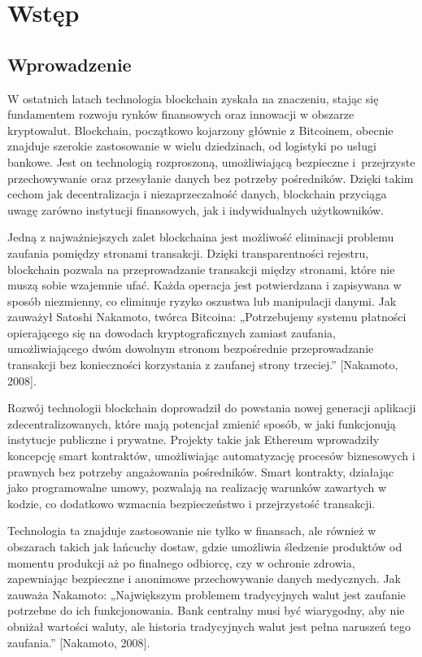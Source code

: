 \chapter{Wstęp}

\section{Wprowadzenie}

W ostatnich latach technologia blockchain zyskała na znaczeniu, stając się fundamentem rozwoju rynków finansowych oraz innowacji w obszarze kryptowalut. Blockchain, początkowo kojarzony głównie z Bitcoinem, obecnie znajduje szerokie zastosowanie w wielu dziedzinach, od logistyki po usługi bankowe. Jest on technologią rozproszoną, umożliwiającą bezpieczne i~przejrzyste przechowywanie oraz przesyłanie danych bez potrzeby pośredników. Dzięki takim cechom jak decentralizacja i niezaprzeczalność danych, blockchain przyciąga uwagę zarówno instytucji finansowych, jak i indywidualnych użytkowników.

Jedną z najważniejszych zalet blockchaina jest możliwość eliminacji problemu zaufania pomiędzy stronami transakcji. Dzięki transparentności rejestru, blockchain pozwala na przeprowadzanie transakcji między stronami, które nie muszą sobie wzajemnie ufać. Każda operacja jest potwierdzana i zapisywana w sposób niezmienny, co eliminuje ryzyko oszustwa lub manipulacji danymi. Jak zauważył Satoshi Nakamoto, twórca Bitcoina: „Potrzebujemy systemu płatności opierającego się na dowodach kryptograficznych zamiast zaufania, umożliwiającego dwóm dowolnym stronom bezpośrednie przeprowadzanie transakcji bez konieczności korzystania z zaufanej strony trzeciej.” [Nakamoto, 2008].

Rozwój technologii blockchain doprowadził do powstania nowej generacji aplikacji zdecentralizowanych, które mają potencjał zmienić sposób, w jaki funkcjonują instytucje publiczne i prywatne. Projekty takie jak Ethereum wprowadziły koncepcję smart kontraktów, umożliwiając automatyzację procesów biznesowych i prawnych bez potrzeby angażowania pośredników. Smart kontrakty, działając jako programowalne umowy, pozwalają na realizację warunków zawartych w kodzie, co dodatkowo wzmacnia bezpieczeństwo i przejrzystość transakcji.

Technologia ta znajduje zastosowanie nie tylko w finansach, ale również w obszarach takich jak łańcuchy dostaw, gdzie umożliwia śledzenie produktów od momentu produkcji aż po finalnego odbiorcę, czy w ochronie zdrowia, zapewniając bezpieczne i anonimowe przechowywanie danych medycznych. Jak zauważa Nakamoto: „Największym problemem tradycyjnych walut jest zaufanie potrzebne do ich funkcjonowania. Bank centralny musi być wiarygodny, aby nie obniżał wartości waluty, ale historia tradycyjnych walut jest pełna naruszeń tego zaufania.” [Nakamoto, 2008].

